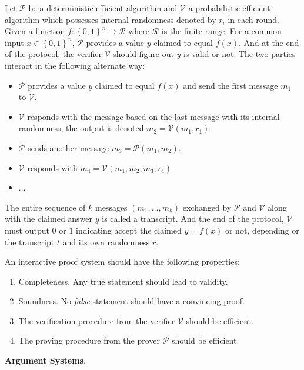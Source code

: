 \documentclass{article}
\begin{document}
\begin{boxx1}
Let $\mathcal{P}$ be a deterministic efficient algorithm and $\mathcal{V}$ a probabilistic efficient algorithm which possesses internal randomness denoted by $r_i$ in each round. Given a function $f: \left\{ 0, 1 \right\}^n \rightarrow \mathcal{R}$ where $\mathcal{R}$ is the finite range. For a common input $x \in \left\{ 0, 1 \right\}^n$, $\mathcal{P}$ provides a value $y$ claimed to equal $f(x)$. And at the end of the protocol, the verifier $\mathcal{V}$ should figure out $y$ is valid or not. The two parties interact in the following alternate way: 
\begin{itemize}
\item $\mathcal{P}$ provides a value $y$ claimed to equal $f(x)$ and send the first message $m_1$ to $\mathcal{V}$. 
\item $\mathcal{V}$ responds with the message based on the last message with its internal randomness, the output is denoted $m_2 = \mathcal{V}(m_1, r_1)$. 
\item $\mathcal{P}$ sends another message $m_3 = \mathcal{P}(m_1, m_2)$. 
\item $\mathcal{V}$ responds with $m_4 = \mathcal{V}(m_1, m_2, m_3, r_4)$ 
\item $\dots$
\end{itemize}
The entire sequence of $k$ messages $(m_1, \dots, m_k)$ exchanged by $\mathcal{P}$ and $\mathcal{V}$ along with the claimed answer $y$ is called a transcript. And the end of the protocol, $\mathcal{V}$ must output $0$ or $1$ indicating accept the claimed $y = f(x)$ or not, depending or the transcript $t$ and its own randomness $r$. 
\end{boxx1}

An interactive proof system should have the following properties: 
\begin{enumerate}
\item\label{item:47} Completeness. Any true statement should lead to validity. 
\item\label{item:48} Soundness. No \textit{false} statement should have a convincing proof. 
\item\label{item:49} The verification procedure from the verifier $\mathcal{V}$ should be efficient. 
\item\label{item:50} The proving procedure from the prover $\mathcal{P}$ should be efficient. 
\end{enumerate}

\textbf{Argument Systems}. 
\end{document}
